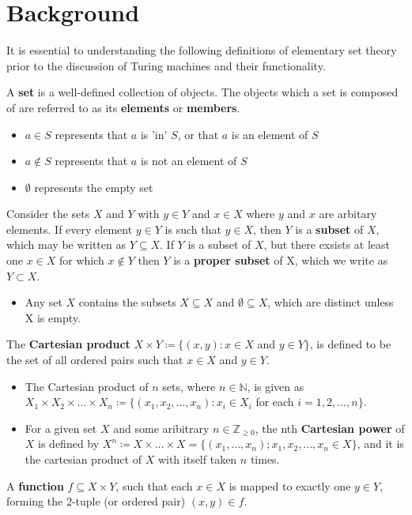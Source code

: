\documentclass{article}
\begin{document}
\section{Background}
It is essential to understanding the following definitions of elementary set theory prior to the discussion of Turing machines and their functionality.
\begin{defin}
A \textbf{set} is a well-defined collection of objects. The objects which a set is composed of are referred to as its \textbf{elements} or \textbf{members}.
\begin{itemize}
\item $a \in S$ represents that $a$ is 'in' $S$, or that $a$ is an element of $S$
\item $a \notin S$ represents that $a$ is not an element of $S$
\item $\emptyset$ represents the empty set
\end{itemize}
\end{defin}
\begin{defin}
Consider the sets $X$ and $Y$ with $y \in Y$ and $x \in X$ where $y$ and $x$ are arbitary elements. If every element $y \in Y$ is such that $y \in X$, then $Y$ is a \textbf{subset} of $X$, which may be written as $Y\subseteq X$.
If $Y$ is a subset of $X$, but there exsists at least one $x \in X$ for which $x \notin Y$ then $Y$ is a \textbf{proper subset} of X, which we write as $Y \subset X$.
\begin{itemize}
\item Any set $X$ contains the subsets $X \subseteq X$ and $\emptyset \subseteq X$, which are distinct unless X is empty.
\end{itemize}
\end{defin}
\begin{defin}
The \textbf{Cartesian product} $X \times Y \coloneq \{ (x, y): x \in X$ and $y \in Y \}$, is defined to be the set of all ordered pairs such that $x \in X$ and $y \in Y$.
\begin{itemize}
\item The Cartesian product of $n$ sets, where $n \in \mathbb{N}$, is given as
$X_{1}\times X_{2} \times {...} \times X_{n} \coloneq \{( x_{1},x_{2},{...},x_{n}):x_{i}\in X_{i}$ for each $i = 1,2,{...},n\}$.
\item For a given set $X$ and some aribitrary $n \in \mathbb{Z}_{\geq 0}$, the nth \textbf{Cartesian power} of $X$ is defined by
$X^{n} \coloneq X \times {...} \times X = \{(x_{1},{...},x_n) ; x_{1},x_{2},{...},x_{n}\in X\}$, and it is the cartesian product of $X$ with itself taken $n$ times.
\end{itemize}
\end{defin}
\begin{defin}
A \textbf{function} $f \subseteq X \times Y$, such that each $x \in X$ is mapped to exactly one $y \in Y$, forming the 2-tuple (or ordered pair) $(x, y) \in f$. \cite{2}
\end{defin}
\end{document}
